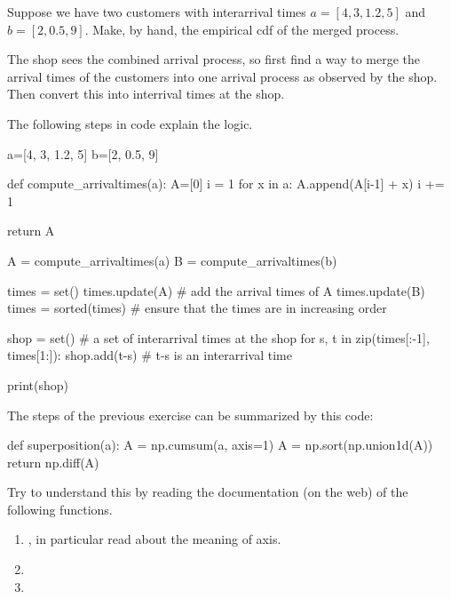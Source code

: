 \documentclass{scrartcl}
\begin{document}
\begin{exercise}
  Suppose we have two customers with interarrival times $a=[4, 3, 1.2, 5]$ and $b=[2, 0.5, 9]$. Make, by hand, the empirical cdf of the merged process.
  \begin{hint}
  The shop sees the combined arrival process, so  first find a way to merge the arrival times of the customers into one arrival process as observed by the shop. Then  convert this into interrival times at the shop. 
  \end{hint}
  \begin{solution}
    The following steps in code explain the logic.
    \begin{pyblock}
a=[4, 3, 1.2, 5]
b=[2, 0.5, 9]

def compute_arrivaltimes(a):
    A=[0]
    i = 1
    for x in a:
        A.append(A[i-1] + x)
        i += 1

    return A

A = compute_arrivaltimes(a)
B = compute_arrivaltimes(b)


times = set()
times.update(A) # add the arrival times of A 
times.update(B)
times = sorted(times) # ensure that the times are in increasing order

shop = set() # a set of interarrival times at the shop
for s, t in zip(times[:-1], times[1:]):
    shop.add(t-s) # t-s is an interarrival time

print(shop)
    \end{pyblock}
  \end{solution}
\end{exercise}


\begin{exercise}
  The steps of the previous exercise can be summarized by this code:
\begin{pyverbatim}
def superposition(a):
    A = np.cumsum(a, axis=1)
    A = np.sort(np.union1d(A))
    return np.diff(A)

\end{pyverbatim}  

Try to understand this by reading the documentation (on the web) of the following functions.
\begin{enumerate}
\item {}, in particular read about the meaning of axis.
\item {}
\item {}
\end{enumerate}
\end{exercise}
\end{document}
